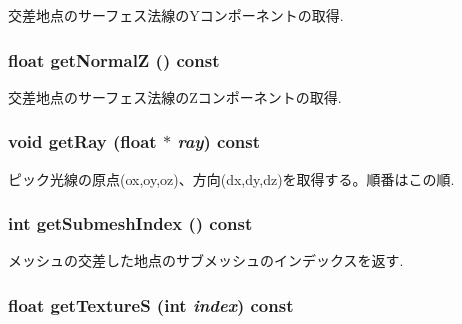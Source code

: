 交差地点のサーフェス法線のYコンポーネントの取得. \hypertarget{classm3g_1_1RayIntersection_5d0569741397401f53b776f16d08f5c3}{
\subsubsection[{getNormalZ}]{\setlength{\rightskip}{0pt plus 5cm}float getNormalZ () const}}
\label{classm3g_1_1RayIntersection_5d0569741397401f53b776f16d08f5c3}


交差地点のサーフェス法線のZコンポーネントの取得. \hypertarget{classm3g_1_1RayIntersection_3f4d1f2f24c0dadab914014836e1b138}{
\subsubsection[{getRay}]{\setlength{\rightskip}{0pt plus 5cm}void getRay (float $\ast$ {\em ray}) const}}
\label{classm3g_1_1RayIntersection_3f4d1f2f24c0dadab914014836e1b138}


ピック光線の原点(ox,oy,oz)、方向(dx,dy,dz)を取得する。順番はこの順. \hypertarget{classm3g_1_1RayIntersection_6a11c61d1a1fecc01f2f83463404a6b8}{
\subsubsection[{getSubmeshIndex}]{\setlength{\rightskip}{0pt plus 5cm}int getSubmeshIndex () const}}
\label{classm3g_1_1RayIntersection_6a11c61d1a1fecc01f2f83463404a6b8}


メッシュの交差した地点のサブメッシュのインデックスを返す. \hypertarget{classm3g_1_1RayIntersection_bc14e1d5a83d5fca608b1fbf772614d4}{
\subsubsection[{getTextureS}]{\setlength{\rightskip}{0pt plus 5cm}float getTextureS (int {\em index}) const}}
\label{classm3g_1_1RayIntersection_bc14e1d5a83d5fca608b1fbf772614d4}


